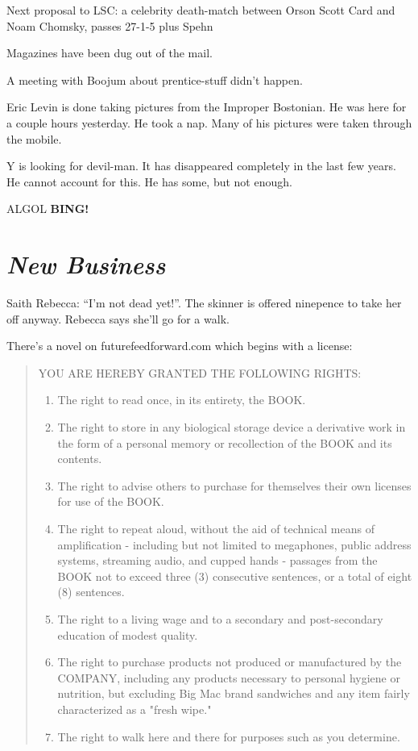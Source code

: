 \documentclass[10pt]{article}
\newcommand{\bing}{{\bf BING!} }
\newcommand{\goto}[1]{\bing \vskip 12pt \section*{{\em{#1}}}}
\newcommand{\ps}{ plus Spehn\xspace}
\begin{document}
Next proposal to LSC: a celebrity death-match between Orson Scott Card
and Noam Chomsky, passes 27-1-5\ps

Magazines have been dug out of the mail.

A meeting with Boojum about prentice-stuff didn't happen.

Eric Levin is done taking pictures from the Improper Bostonian.  He
was here for a couple hours yesterday.  He took a nap.  Many of his
pictures were taken through the mobile.

Y is looking for devil-man.  It has disappeared completely in the last
few years.  He cannot account for this.  He has some, but not enough.

ALGOL
\goto{New Business}



Saith Rebecca: ``I'm not dead yet!''.  The skinner is offered
ninepence to take her off anyway.  Rebecca says she'll go for a walk.

There's a novel on futurefeedforward.com which begins with a license:

\begin{quotation}

YOU ARE HEREBY GRANTED THE FOLLOWING RIGHTS:
\begin{enumerate}
 \item  The right to read once, in its entirety, the BOOK.
 \item  The right to store in any biological storage device a derivative work in the form of a personal memory or recollection of the BOOK and its contents.
 \item  The right to advise others to purchase for themselves their own licenses for use of the BOOK.
 \item  The right to repeat aloud, without the aid of technical means of amplification - including but not limited to megaphones, public address systems, streaming audio, and cupped hands - passages from the BOOK not to exceed three (3) consecutive sentences, or a total of eight (8) sentences.
 \item  The right to a living wage and to a secondary and post-secondary education of modest quality.
 \item  The right to purchase products not produced or manufactured by the COMPANY, including any products necessary to personal hygiene or nutrition, but excluding Big Mac brand sandwiches and any item fairly characterized as a "fresh wipe."
 \item  The right to walk here and there for purposes such as you determine.
\end{enumerate}
\end{quotation}
\end{document}
